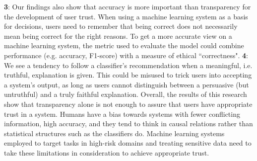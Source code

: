 \textbf{3}: Our findings also show that accuracy is more important than transparency for the development of user trust. When using a machine learning system as a basis for decisions, users need to remember that being correct does not necessarily mean being correct for the right reasons. To get a more accurate view on a machine learning system, the metric used to evaluate the model could combine performance (e.g. accuracy, F1-score) with a measure of ethical ``correctness".\newline
\textbf{4}: We see a tendency to follow a classifier's recommendation when a meaningful, i.e. truthful, explanation is given. This could be misused to trick users into accepting a system's output, as long as users cannot distinguish between a persuasive (but untruthful) and a truly faithful explanation.\medskip \newline
Overall, the results of this research show that transparency alone is not enough to assure that users have appropriate trust in a system. Humans have a bias towards systems with fewer conflicting information, high accuracy, and they tend to think in causal relations rather than statistical structures such as the classifiers do. Machine learning systems employed to target tasks in high-risk domains and treating sensitive data need to take these limitations in consideration to achieve appropriate trust.


